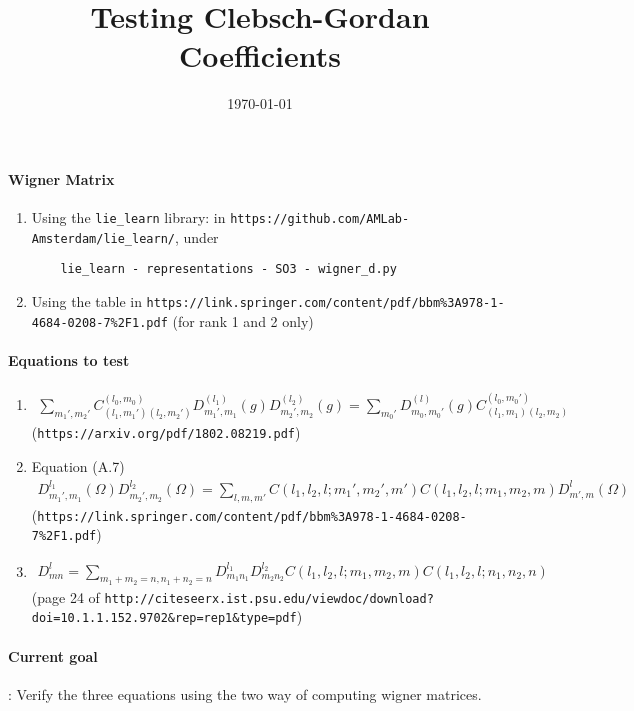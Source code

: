 \documentclass[12pt]{amsart}
\theoremstyle{plain}
\theoremstyle{definition}
\theoremstyle{remark}
\numberwithin{equation}{section}
\begin{document}
\title{Testing Clebsch-Gordan Coefficients}
\date{\today}  %
\maketitle
\paragraph{\textbf{Wigner Matrix}}
\begin{enumerate}
    \item Using the \texttt{lie\_learn} library: in \texttt{https://github.com/AMLab-Amsterdam/lie\_learn/}, under 
    \begin{verbatim}
    lie_learn - representations - SO3 - wigner_d.py
    \end{verbatim}
    \item Using the table in \texttt{https://link.springer.com/content/pdf/bbm\%3A978-1-4684-0208-7\%2F1.pdf} (for rank 1 and 2 only)
\end{enumerate}

\paragraph{\textbf{Equations to test}}
\begin{enumerate}
    \item 
    \begin{align*}
        \sum_{m_1', m_2'} C^{(l_0,m_0)}_{(l_1,m_1')(l_2,m_2')} D^{(l_1)}_{m_1',m_1}(g)D^{(l_2)}_{m_2',m_2}(g) = \sum_{m_0'} D^{(l)}_{m_0,m_0'}(g) C^{(l_0,m_0')}_{(l_1,m_1)(l_2,m_2)}
    \end{align*}
    (\texttt{https://arxiv.org/pdf/1802.08219.pdf})
    
    \item Equation (A.7)
    \begin{align*}
        D^{l_1}_{m_1', m_1}(\Omega)D^{l_2}_{m_2',m_2}(\Omega) = \sum_{l, m, m'} C(l_1,l_2,l;m_1',m_2', m') C(l_1, l_2, l;m_1, m_2, m)D^l_{m',m}(\Omega)
    \end{align*}
    (\texttt{https://link.springer.com/content/pdf/bbm\%3A978-1-4684-0208-7\%2F1.pdf})
    
    \item 
    \begin{align*}
        D^l_{mn} = \sum_{m_1+m_2=n,n_1+n_2=n} D^{l_1}_{m_1 n_1} D^{l_2}_{m_2 n_2} C(l_1,l_2,l;m_1,m_2,m)C(l_1,l_2,l;n_1,n_2,n)
    \end{align*}
    (page 24 of \texttt{http://citeseerx.ist.psu.edu/\break viewdoc/download?doi=10.1.1.152.9702\&rep=rep1\&type=pdf})

\end{enumerate}

\paragraph{\textbf{Current goal}}: Verify the three equations using the two way of computing wigner matrices.
\end{document}
